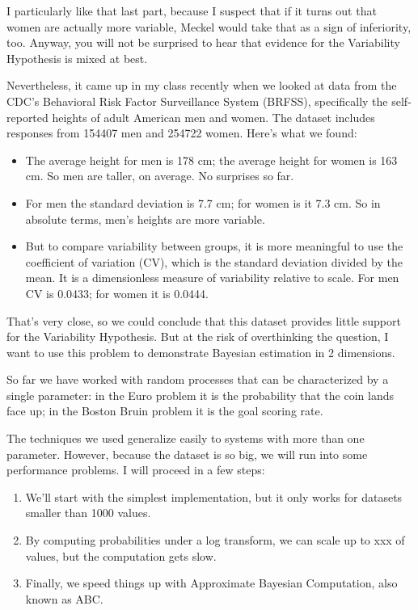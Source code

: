 \documentclass[12pt]{book}
\begin{document}
I particularly like that last part, because I suspect that if it turns
out that women are actually more variable, Meckel would take that as a
sign of inferiority, too.  Anyway, you will not be surprised to hear
that evidence for the Variability Hypothesis is mixed at best.

Nevertheless, it came up in my class recently when we looked at data
from the CDC's Behavioral Risk Factor Surveillance System (BRFSS),
specifically the self-reported heights of adult American men and women.
The dataset includes responses from 154407 men and 254722 women.
Here's what we found:

\begin{itemize}

\item The average height for men is 178 cm; the average height for
  women is 163 cm.  So men are taller, on average.  No surprises so
  far.

\item For men the standard deviation is 7.7 cm; for women is it 7.3
  cm.  So in absolute terms, men's heights are more variable.

\item But to compare
variability between groups, it is more meaningful to use the
coefficient of variation (CV), which is the standard deviation divided
by the mean.  It is a dimensionless measure of variability relative to
scale.  For men CV is 0.0433; for women it is 0.0444.

\end{itemize}

That's very close, so we could conclude that this dataset provides little
support for the Variability Hypothesis.  But at the risk of overthinking
the question, I want to use this problem to demonstrate Bayesian
estimation in 2 dimensions.

So far we have worked with random processes that can be characterized
by a single parameter: in the Euro problem it is the probability
that the coin lands face up; in the Boston Bruin problem it is the
goal scoring rate.

The techniques we used generalize easily to systems with more than one
parameter.  However, because the dataset is so big, we will run into
some performance problems.  I will proceed in a few steps:

\begin{enumerate}

\item We'll start with the simplest implementation, but it only
works for datasets smaller than 1000 values.

\item By computing probabilities under a log transform, we can
scale up to xxx of values, but the computation gets slow.

\item Finally, we speed things up with Approximate Bayesian Computation,
also known as ABC.

\end{enumerate}
\end{document}
